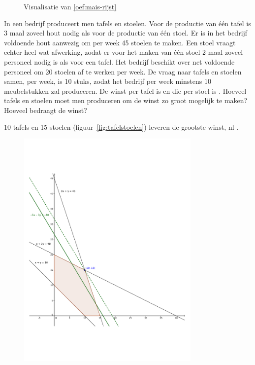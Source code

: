 \begin{oef}
\begin{opl}
\begin{figure}[hbtp]
  \caption{Visualisatie van \cref{oef:mais-rijst}}
  \label{fig:mais-en-rijst}
\end{figure}
\end{opl}
\end{oef}
     
     
\begin{oef}
In een bedrijf produceert men tafels en stoelen. Voor de
productie van \'e\'en tafel is 3 maal zoveel hout nodig als
voor de productie van \'e\'en stoel. Er is in het bedrijf voldoende
hout aanwezig om per week 45 stoelen te maken. Een stoel vraagt echter
heel wat afwerking, zodat er voor het maken van \'{e}\'{e}n
stoel 2 maal zoveel personeel nodig is als voor een tafel. Het
bedrijf beschikt over net voldoende personeel om 20 stoelen af te
werken per week. De vraag naar tafels en stoelen samen, per week,
is 10 stuks, zodat het bedrijf per week minstens 10 meubelstukken zal produceren. De winst per tafel is  en die per stoel is
. Hoeveel tafels en stoelen moet men produceren om de
winst zo groot mogelijk te maken? Hoeveel bedraagt de winst?
\begin{opl}
10 tafels en 15 stoelen (figuur~\ref{fig:tafelstoelen}) leveren de grootste winst, nl .
\begin{figure}[hbtp]
\centering
\includegraphics[width=0.8\textwidth]{oefeningen/FigurenLP/Oef7.pdf}

\end{figure}
\end{opl}
\end{oef}
